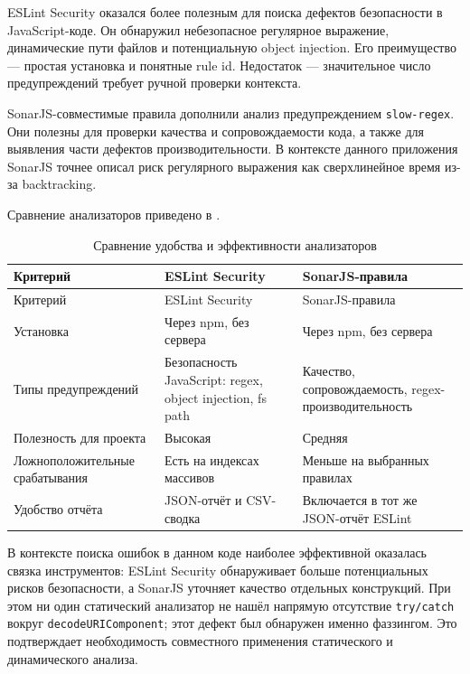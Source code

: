 ESLint Security оказался более полезным для поиска дефектов безопасности в
JavaScript-коде. Он обнаружил небезопасное регулярное выражение, динамические пути
файлов и потенциальную object injection. Его преимущество --- простая установка и
понятные rule id. Недостаток --- значительное число предупреждений требует ручной
проверки контекста.

SonarJS-совместимые правила дополнили анализ предупреждением \texttt{slow-regex}.
Они полезны для проверки качества и сопровождаемости кода, а также для выявления
части дефектов производительности. В контексте данного приложения SonarJS точнее
описал риск регулярного выражения как сверхлинейное время из-за backtracking.

Сравнение анализаторов приведено в .

\noindent
\begingroup
\centering
\small
\begin{longtable}[c]{|p{4cm}|p{5.5cm}|p{5.5cm}|}
    \caption{Сравнение удобства и эффективности анализаторов}
    \label{tab:analyzer-comparison}
    \\
    \hline
    Критерий & ESLint Security & SonarJS-правила \\ \hline
    \endfirsthead
    \hline
    Критерий & ESLint Security & SonarJS-правила \\ \hline
    \endhead
    \hline
    Установка & Через npm, без сервера & Через npm, без сервера \\ \hline
    Типы предупреждений & Безопасность JavaScript: regex, object injection, fs path & Качество, сопровождаемость, regex-производительность \\ \hline
    Полезность для проекта & Высокая & Средняя \\ \hline
    Ложноположительные срабатывания & Есть на индексах массивов & Меньше на выбранных правилах \\ \hline
    Удобство отчёта & JSON-отчёт и CSV-сводка & Включается в тот же JSON-отчёт ESLint \\ \hline
\end{longtable}
\normalsize
\endgroup

В контексте поиска ошибок в данном коде наиболее эффективной оказалась связка
инструментов: ESLint Security обнаруживает больше потенциальных рисков безопасности,
а SonarJS уточняет качество отдельных конструкций. При этом ни один статический
анализатор не нашёл напрямую отсутствие \texttt{try/catch} вокруг
\texttt{decodeURIComponent}; этот дефект был обнаружен именно фаззингом. Это
подтверждает необходимость совместного применения статического и динамического
анализа.

